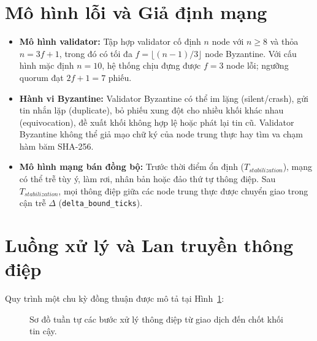 \documentclass[10pt,a4paper]{report}
\begin{document}
\section{Mô hình lỗi và Giả định mạng}
\begin{itemize}
  \item \textbf{Mô hình validator:} Tập hợp validator cố định $n$ node với $n \ge 8$ và thỏa $n = 3f + 1$, trong đó có tối đa $f = \lfloor(n - 1) / 3\rfloor$ node Byzantine. Với cấu hình mặc định $n = 10$, hệ thống chịu đựng được $f = 3$ node lỗi; ngưỡng quorum đạt $2f + 1 = 7$ phiếu.
  \item \textbf{Hành vi Byzantine:} Validator Byzantine có thể im lặng (silent/crash), gửi tin nhắn lặp (duplicate), bỏ phiếu xung đột cho nhiều khối khác nhau (equivocation), đề xuất khối không hợp lệ hoặc phát lại tin cũ. Validator Byzantine không thể giả mạo chữ ký của node trung thực hay tìm va chạm hàm băm SHA-256.
  \item \textbf{Mô hình mạng bán đồng bộ:} Trước thời điểm ổn định ($T_{stabilization}$), mạng có thể trễ tùy ý, làm rơi, nhân bản hoặc đảo thứ tự thông điệp. Sau $T_{stabilization}$, mọi thông điệp giữa các node trung thực được chuyển giao trong cận trễ $\Delta$ (\texttt{delta\_bound\_ticks}).
\end{itemize}

\section{Luồng xử lý và Lan truyền thông điệp}
Quy trình một chu kỳ đồng thuận được mô tả tại Hình~\ref{fig:message-flow}:

\begin{figure}[H]
\centering
{}
\caption{Sơ đồ tuần tự các bước xử lý thông điệp từ giao dịch đến chốt khối tin cậy.}
\label{fig:message-flow}
\end{figure}
\end{document}
